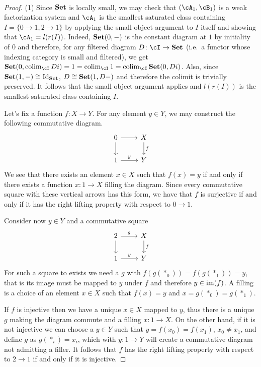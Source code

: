 \documentclass[a4paper,11pt,openany]{scrartcl}
\begin{document}
~\\
\begin{proof}
    (1) Since $\operatorname{\mathbf{Set}}$ is locally small, we may check that $(\cA_1,\cB_1)$ is a weak
    factorization system and $\cA_1$ is the smallest saturated class containing
    $I=\{0\rightarrow 1,2\rightarrow 1\}$ by applying the small object argument
    to $I$ itself and showing that $\cA_1=l(r(I))$. Indeed, $\operatorname{\mathbf{Set}}(0,-)$ is the
    constant diagram at $1$ by initiality of
    $0$ and therefore,
    for any filtered diagram $D\colon\cI\rightarrow\Set$ (i.e.\ a functor whose
    indexing category is small and filtered), we get
    $\Set(0,\colim_{\cI}Di)=1=\colim_{\cI}1=\colim_\cI\Set(0,Di)$. Also,
    since $\operatorname{\mathbf{Set}}(1,-)\cong\operatorname{Id}_{\operatorname{\mathbf{Set}}}$, $D\cong\operatorname{\mathbf{Set}}(1,D-)$ and therefore the colimit
    is trivially preserved. It follows that the small object argument applies
    and $l(r(I))$ is the smallest saturated class containing $I$.

    Let's fix a function $f\colon X\rightarrow Y$. For any element $y\in Y$, we
    may construct the following commutative diagram.
    \[
        \begin{tikzcd}
            0\ar[r]\ar[d]
            & X\ar[d, "f"] \\
            1\ar[r, "y"]
            & Y
        \end{tikzcd}
    \]
    We see that there exists an element $x\in X$ such that $f(x)=y$ if and only
    if there exists a function $x\colon 1\rightarrow X$ filling the diagram.
    Since every commutative square with these vertical arrows has this form, we
    have that $f$ is surjective if and only if it has the right lifting property
    with respect to $0\rightarrow 1$.

    Consider now $y\in Y$ and a commutative square
    \[
        \begin{tikzcd}
            2\ar[r, "g"]\ar[d]
            & X\ar[d, "f"] \\
            1\ar[r, "y"]
            & Y
        \end{tikzcd}
    \]
    For such a square to exists we need a $g$ with $f(g(*_0))=f(g(*_1))=y$, that
    is its image must be mapped to $y$ under $f$ and therefore $y\in\operatorname{im}(f)$.
    A filling is a choice of an element $x\in X$ such that $f(x)=y$ and
    $x=g(*_0)=g(*_1)$.

    \noindent If $f$ is injective then we have a unique $x\in X$ mapped
    to $y$, thus there is a unique $g$ making the diagram commute and a filling
    $x\colon 1\rightarrow X$. On the other hand, if it is not injective we can
    choose a $y\in Y$ such that $y=f(x_0)=f(x_1)$, $x_0\neq x_1$, and define $g$
    as $g(*_i)=x_i$, which with $y\colon 1\rightarrow Y$ will create a
    commutative diagram not admitting a filler. It follows that $f$ has the
    right lifting property with respect to $2\rightarrow 1$ if and only if it is
    injective.


\end{proof}
\end{document}
